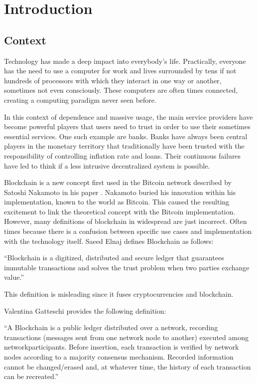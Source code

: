 \documentclass[..]{subfiles}
\begin{document}
\chapter{Introduction}\label{chap:introduction}

\section{Context}

Technology has made a deep impact into everybody's life. Practically, everyone has the need to use a computer for work and lives surrounded by tens if not hundreds of processors with which they interact in one way or another, sometimes not even consciously. These computers are often times connected, creating a computing paradigm never seen before. 

In this context of dependence and massive usage, the main service providers have become powerful players that users need to trust in order to use their sometimes essential services. One such example are banks. Banks have always been central players in the monetary territory that traditionally have been trusted with the responsibility of controlling inflation rate and loans. Their continuous failures have led to think if a less intrusive decentralized system is possible.

Blockchain is a new concept first used in the Bitcoin network described by Satoshi Nakamoto in his paper \cite{nakamoto2008bitcoin}. Nakamoto buried his innovation within his implementation, known to the world as Bitcoin. This caused the resulting excitement to link the theoretical concept with the Bitcoin implementation. However, many definitions of blockchain in widespread are just incorrect. Often times because there is a confusion between specific use cases and implementation with the technology itself. Saeed Elnaj defines Blockchain as follows:
\begin{displayquote}
	``Blockchain is a digitized, distributed and secure ledger that guarantees immutable transactions and solves the trust problem when two parties exchange value.''\cite{elnaj2018problems}
\end{displayquote}
This definition is misleading since it fuses cryptocurrencies and blockchain.

Valentina Gatteschi provides the following definition:
\begin{displayquote}
	``A Blockchain is a public ledger distributed over a network, recording transactions (messages sent from one network node to another) executed among networkparticipants. Before insertion, each transaction is verified by network nodes according to a majority consensus mechanism. Recorded information cannot be changed/erased and, at whatever time, the history of each transaction can be recreated.''\cite{gatteschi2018blockchain}
\end{displayquote}
\end{document}
